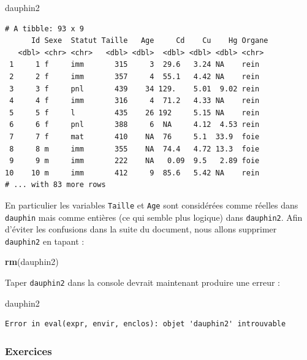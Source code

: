 \documentclass[a4paperpaper,]{article}
\newenvironment{Shaded}{\begin{snugshade}}{\end{snugshade}}
\newcommand{\KeywordTok}[1]{\textcolor[rgb]{0.13,0.29,0.53}{\textbf{#1}}}
\newcommand{\NormalTok}[1]{#1}
\theoremstyle{definition}
\theoremstyle{definition}
\theoremstyle{definition}
\theoremstyle{remark}
\begin{document}
\begin{Shaded}
\begin{Highlighting}[]
\NormalTok{dauphin2}
\end{Highlighting}
\end{Shaded}

\begin{verbatim}
# A tibble: 93 x 9
      Id Sexe  Statut Taille   Age     Cd    Cu    Hg Organe
   <dbl> <chr> <chr>   <dbl> <dbl>  <dbl> <dbl> <dbl> <chr> 
 1     1 f     imm       315     3  29.6   3.24 NA    rein  
 2     2 f     imm       357     4  55.1   4.42 NA    rein  
 3     3 f     pnl       439    34 129.    5.01  9.02 rein  
 4     4 f     imm       316     4  71.2   4.33 NA    rein  
 5     5 f     l         435    26 192     5.15 NA    rein  
 6     6 f     pnl       388     6  NA     4.12  4.53 rein  
 7     7 f     mat       410    NA  76     5.1  33.9  foie  
 8     8 m     imm       355    NA  74.4   4.72 13.3  foie  
 9     9 m     imm       222    NA   0.09  9.5   2.89 foie  
10    10 m     imm       412     9  85.6   5.42 NA    rein  
# ... with 83 more rows
\end{verbatim}

En particulier les variables \texttt{Taille} et \texttt{Age} sont
considérées comme réelles dans \texttt{dauphin} mais comme entières (ce
qui semble plus logique) dans \texttt{dauphin2}. Afin d'éviter les
confusions dans la suite du document, nous allons supprimer
\texttt{dauphin2} en tapant :

\begin{Shaded}
\begin{Highlighting}[]
\KeywordTok{rm}\NormalTok{(dauphin2)}
\end{Highlighting}
\end{Shaded}

Taper \texttt{dauphin2} dans la console devrait maintenant produire une
erreur :

\begin{Shaded}
\begin{Highlighting}[]
\NormalTok{dauphin2}
\end{Highlighting}
\end{Shaded}

\begin{verbatim}
Error in eval(expr, envir, enclos): objet 'dauphin2' introuvable
\end{verbatim}

\subsubsection{Exercices}\label{exercices-8}
\end{document}
